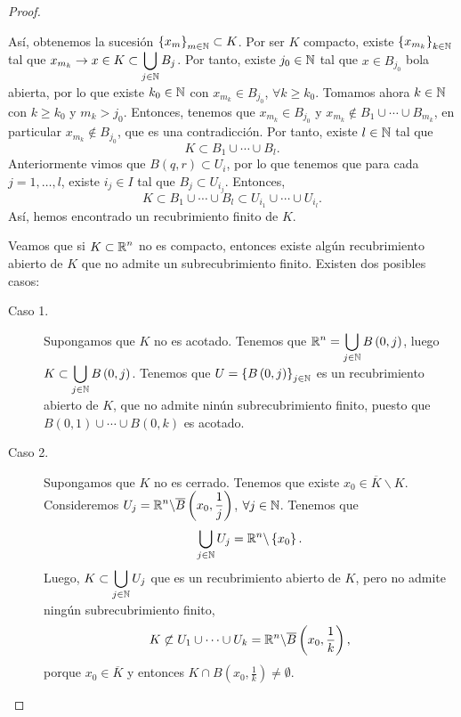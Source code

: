\begin{proof}
\begin{description}
\begin{itemize}
		\end{itemize}
		Así, obtenemos la sucesión $\displaystyle \left\{ x_{m}\right\} _{m\in\mathbb{N}} \subset K $. Por ser $\displaystyle K $ compacto, existe $\displaystyle \left\{ x_{m_{k}}\right\} _{k \in \mathbb{N}} $ tal que $\displaystyle x_{m_{k}} \to x \in K \subset \bigcup_{j \in \mathbb{N}}B_{j} $. 
Por tanto, existe $\displaystyle j_{0} \in \mathbb{N} $ tal que $\displaystyle x \in B_{j_{0}} $ bola abierta, por lo que existe $\displaystyle k_{0} \in \mathbb{N} $ con $\displaystyle x_{m_{k}} \in B_{j_{0}} $, $\displaystyle \forall k \geq k_{0} $.
Tomamos ahora $\displaystyle k \in \mathbb{N} $ con $\displaystyle k \geq k_{0} $ y $\displaystyle m_{k} > j_{0} $. Entonces, tenemos que $\displaystyle x_{m_{k}} \in B_{j_{0}} $ y $\displaystyle x_{m_{k}} \not\in B_{1} \cup \cdots \cup B_{m_{k}} $, en particular $\displaystyle x_{m_{k}} \not\in B_{j_{0}} $, que es una contradicción. 
Por tanto, existe $\displaystyle l \in \mathbb{N} $ tal que 
\[K \subset B_{1} \cup \cdots \cup B_{l} .\]
Anteriormente vimos que $\displaystyle  B\left(q,r\right) \subset U_{i} $, por lo que tenemos que para cada $\displaystyle j = 1, \ldots, l $, existe $\displaystyle i_{j} \in I $ tal que $\displaystyle B_{j} \subset U_{i_{j}} $. Entonces, 
\[K \subset B_{1} \cup \cdots \cup B_{l} \subset U_{i_{1}} \cup \cdots \cup U_{i_{l}} .\]
Así, hemos encontrado un recubrimiento finito de $\displaystyle K $.
\item[(ii)] Veamos que si $\displaystyle K \subset \mathbb{R}^{n} $ no es compacto, entonces existe algún recubrimiento abierto de $\displaystyle K $ que no admite un subrecubrimiento finito. Existen dos posibles casos:
	\begin{description}
		\item[Caso 1.] Supongamos que $\displaystyle K $ no es acotado. Tenemos que $\displaystyle \mathbb{R}^{n} = \bigcup_{j \in \mathbb{N}}B\left(0,j\right) $, luego $\displaystyle K \subset \bigcup_{j \in \mathbb{N}}B\left(0,j\right) $. Tenemos que $\displaystyle U = \left\{ B\left(0,j\right)\right\} _{j \in \mathbb{N}} $ es un recubrimiento abierto de $\displaystyle K $, que no admite ninún subrecubrimiento finito, puesto que $\displaystyle B\left(0,1\right) \cup \cdots \cup B\left(0,k\right) $ es acotado. 
		\item[Caso 2.] Supongamos que $\displaystyle K $ no es cerrado. Tenemos que existe $\displaystyle x_{0} \in \overline{K}\backslash K $. Consideremos $\displaystyle U_{j} = \mathbb{R}^{n} \backslash \overline{B}\left(x_{0}, \frac{1}{j}\right) $, $\displaystyle \forall j \in \mathbb{N} $. Tenemos que
			\[\bigcup_{ j \in \mathbb{N}}U_{j} = \mathbb{R}^{n} \backslash \left\{ x_{0}\right\}  .\]
	Luego, $\displaystyle K \subset \bigcup_{j \in \mathbb{N}}U_{j} $ que es un recubrimiento abierto de $\displaystyle K $, pero no admite ningún subrecubrimiento finito,
	\[ K \not\subset U_{1} \cup \cdots \cup U_{k} = \mathbb{R}^{n} \backslash \overline{B}\left(x_{0}, \frac{1}{k}\right)  ,\]
	porque $\displaystyle x_{0} \in \overline{K} $ y entonces $\displaystyle K \cap B\left(x_{0}, \frac{1}{k}\right)\neq \emptyset $.
	\end{description}
\end{description}
\end{proof}
